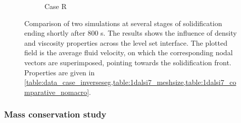 \begin{figure}[htbp]
\begin{subfigure}{0.55\textwidth}
	\caption{Case R}
    \label{fig:1dalsi7_differentprops}
  \end{subfigure}
\caption{Comparison of two simulations at several stages of solidification ending shortly after 800 s.
The results shows the influence of density and viscosity properties across the level set interface.
The plotted field is the average fluid velocity, on which the corresponding nodal vectors are superimposed, pointing
towards the solidification front.
Properties are given in \cref{table:data_case_inverseseg,table:1dalsi7_meshsize,table:1dalsi7_comparative_nomacro}.}
\label{fig:1dalsi7_caseA1R}
\end{figure}


\subsubsection{Mass conservation study}

